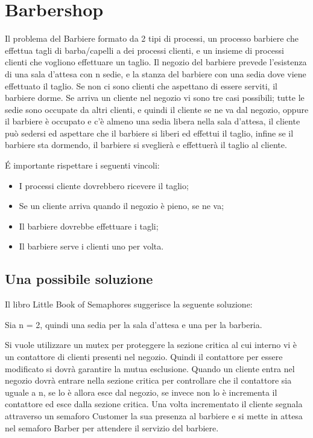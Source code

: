 \section{Barbershop}
Il problema del Barbiere formato da 2 tipi di processi, un processo barbiere che effettua tagli di barba/capelli a dei processi clienti, e un insieme di processi clienti che vogliono effettuare un taglio. Il negozio del barbiere prevede l'esistenza di una sala d'attesa con n sedie, e la stanza del barbiere con una sedia dove viene effettuato il taglio. Se non ci sono clienti che aspettano di essere serviti, il barbiere dorme. Se arriva un cliente nel negozio vi sono tre casi possibili; tutte le sedie sono occupate da altri clienti, e quindi il cliente se ne va dal negozio, oppure il barbiere è occupato e c'è almeno una sedia libera nella sala d'attesa, il cliente può sedersi ed aspettare che il barbiere si liberi ed effettui il taglio, infine se il barbiere sta dormendo, il barbiere si sveglierà e effettuerà il taglio al cliente.

É importante rispettare i seguenti vincoli:

\begin{itemize}
	\item I processi cliente dovrebbero ricevere il taglio;
	\item Se un cliente arriva quando il negozio è pieno, se ne va;
	\item Il barbiere dovrebbe effettuare i tagli;
	\item Il barbiere serve i clienti uno per volta.
	
\end{itemize}

\subsection{Una possibile soluzione}
Il libro Little Book of Semaphores suggerisce la seguente soluzione: 

Sia n = 2, quindi una sedia per la sala d'attesa e una per la barberia. 

Si vuole utilizzare un \textsf{mutex} per proteggere la sezione critica al cui interno vi è un contattore di clienti presenti nel negozio. Quindi il contattore per essere modificato si dovrà garantire la mutua esclusione. Quando un cliente entra nel negozio dovrà entrare nella sezione critica per controllare che il contattore sia uguale a n, se lo è allora esce dal negozio, se invece non lo è incrementa il contattore ed esce dalla sezione critica. Una volta incrementato il cliente segnala attraverso un semaforo \textsf{Customer} la sua presenza al barbiere e si mette in attesa nel semaforo \textsf{Barber} per attendere il servizio del barbiere.

